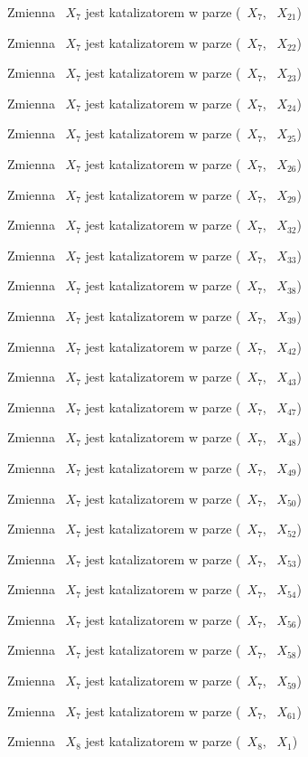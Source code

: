 \documentclass{article}
\begin{document}
Zmienna ~$X_{7}$ jest katalizatorem w parze (~$X_{7}$, ~$X_{21}$)

Zmienna ~$X_{7}$ jest katalizatorem w parze (~$X_{7}$, ~$X_{22}$)

Zmienna ~$X_{7}$ jest katalizatorem w parze (~$X_{7}$, ~$X_{23}$)

Zmienna ~$X_{7}$ jest katalizatorem w parze (~$X_{7}$, ~$X_{24}$)

Zmienna ~$X_{7}$ jest katalizatorem w parze (~$X_{7}$, ~$X_{25}$)

Zmienna ~$X_{7}$ jest katalizatorem w parze (~$X_{7}$, ~$X_{26}$)

Zmienna ~$X_{7}$ jest katalizatorem w parze (~$X_{7}$, ~$X_{29}$)

Zmienna ~$X_{7}$ jest katalizatorem w parze (~$X_{7}$, ~$X_{32}$)

Zmienna ~$X_{7}$ jest katalizatorem w parze (~$X_{7}$, ~$X_{33}$)

Zmienna ~$X_{7}$ jest katalizatorem w parze (~$X_{7}$, ~$X_{38}$)

Zmienna ~$X_{7}$ jest katalizatorem w parze (~$X_{7}$, ~$X_{39}$)

Zmienna ~$X_{7}$ jest katalizatorem w parze (~$X_{7}$, ~$X_{42}$)

Zmienna ~$X_{7}$ jest katalizatorem w parze (~$X_{7}$, ~$X_{43}$)

Zmienna ~$X_{7}$ jest katalizatorem w parze (~$X_{7}$, ~$X_{47}$)

Zmienna ~$X_{7}$ jest katalizatorem w parze (~$X_{7}$, ~$X_{48}$)

Zmienna ~$X_{7}$ jest katalizatorem w parze (~$X_{7}$, ~$X_{49}$)

Zmienna ~$X_{7}$ jest katalizatorem w parze (~$X_{7}$, ~$X_{50}$)

Zmienna ~$X_{7}$ jest katalizatorem w parze (~$X_{7}$, ~$X_{52}$)

Zmienna ~$X_{7}$ jest katalizatorem w parze (~$X_{7}$, ~$X_{53}$)

Zmienna ~$X_{7}$ jest katalizatorem w parze (~$X_{7}$, ~$X_{54}$)

Zmienna ~$X_{7}$ jest katalizatorem w parze (~$X_{7}$, ~$X_{56}$)

Zmienna ~$X_{7}$ jest katalizatorem w parze (~$X_{7}$, ~$X_{58}$)

Zmienna ~$X_{7}$ jest katalizatorem w parze (~$X_{7}$, ~$X_{59}$)

Zmienna ~$X_{7}$ jest katalizatorem w parze (~$X_{7}$, ~$X_{61}$)

Zmienna ~$X_{8}$ jest katalizatorem w parze (~$X_{8}$, ~$X_{1}$)
\end{document}
